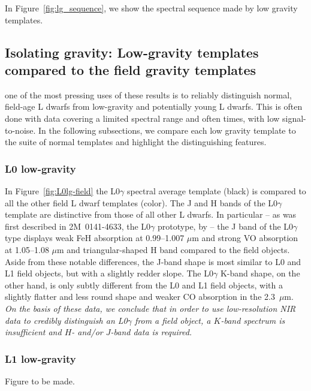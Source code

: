 \documentclass[12pt,preprint]{aastex}
\begin{document}
In Figure~\ref{fig:lg_sequence}, we show the spectral sequence made by low gravity templates.

\subsection{Isolating gravity: Low-gravity templates compared to the field gravity templates} 

one of the most pressing uses of these results is to reliably distinguish normal, field-age L dwarfs from low-gravity and potentially young L dwarfs. This is often done with data covering a limited spectral range and often times, with low signal-to-noise. In the following subsections, we compare each low gravity template to the suite of normal templates and highlight the distinguishing features.

\subsubsection{L0 low-gravity}
In Figure~\ref{fig:L0lg-field} the L0$\gamma$ spectral average template (black) is compared to all the other field L dwarf templates (color).  The J and H bands of the L0$\gamma$ template are distinctive from those of all other L dwarfs. In particular -- as was first described in 2M~0141-4633, the L0$\gamma$ prototype, by \cite{Kirkpatrick06} -- the J band of the L0$\gamma$ type displays weak FeH absorption at 0.99--1.007 $\mu$m and strong VO absorption at 1.05--1.08 $\mu$m and triangular-shaped H band compared to the field objects. Aside from these notable differences, the J-band shape is most similar to L0 and L1 field objects, but with a slightly redder slope. The L0$\gamma$ K-band shape, on the other hand, is only subtly different from the L0 and L1 field objects, with a slightly flatter and less round shape and weaker CO absorption in the 2.3~$\mu$m. 
\emph{On the basis of these data, we conclude that in order to use low-resolution NIR data to credibly distinguish an L0$\gamma$ from a field object, a $K$-band spectrum is insufficient and $H$- and/or $J$-band data is required.}

\subsubsection{L1 low-gravity}
Figure to be made.
\end{document}
